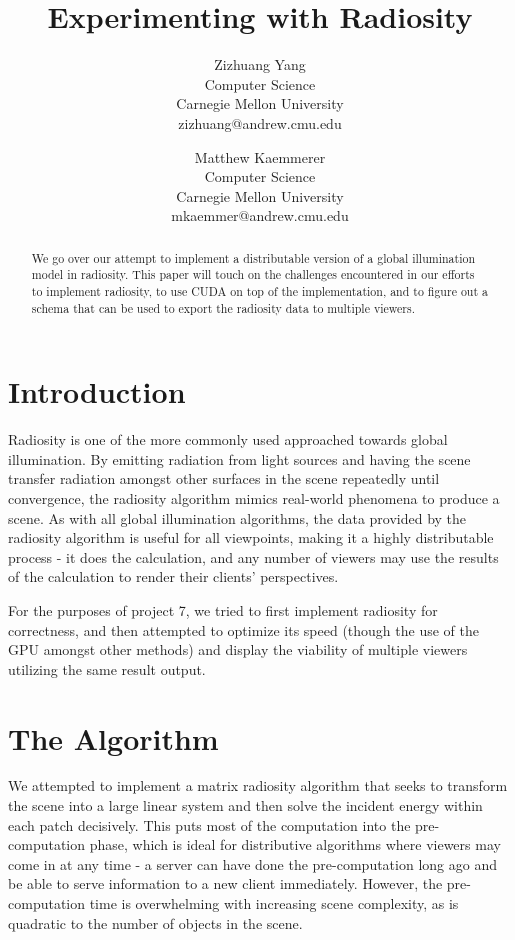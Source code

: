 \documentclass{article}
\title{Experimenting with Radiosity}
\author{Zizhuang Yang \\
        Computer Science \\
        Carnegie Mellon University \\
        zizhuang@andrew.cmu.edu
        \and
        Matthew Kaemmerer \\
        Computer Science \\
        Carnegie Mellon University \\
        mkaemmer@andrew.cmu.edu}
\date{}
\begin{document}
\maketitle
\begin{abstract}
We go over our attempt to implement a distributable version of a global illumination model in radiosity. This paper will touch on the challenges encountered in our efforts to implement radiosity, to use CUDA on top of the implementation, and to figure out a schema that can be used to export the radiosity data to multiple viewers.
\end{abstract}

\begin{multicols}{2}
\section{Introduction}
Radiosity is one of the more commonly used approached towards global illumination. By emitting radiation from light sources and having the scene transfer radiation amongst other surfaces in the scene repeatedly until convergence, the radiosity algorithm mimics real-world phenomena to produce a scene. As with all global illumination algorithms, the data provided by the radiosity algorithm is useful for all viewpoints, making it a highly distributable process - it does the calculation, and any number of viewers may use the results of the calculation to render their clients' perspectives.

For the purposes of project 7, we tried to first implement radiosity for correctness, and then attempted to optimize its speed (though the use of the GPU amongst other methods) and display the viability of multiple viewers utilizing the same result output.

\section{The Algorithm}
We attempted to implement a matrix radiosity algorithm that seeks to transform the scene into a large linear system and then solve the incident energy within each patch decisively. This puts most of the computation into the pre-computation phase, which is ideal for distributive algorithms where viewers may come in at any time - a server can have done the pre-computation long ago and be able to serve information to a new client immediately. However, the pre-computation time is overwhelming with increasing scene complexity, as is quadratic to the number of objects in the scene.


\end{multicols}
\end{document}
